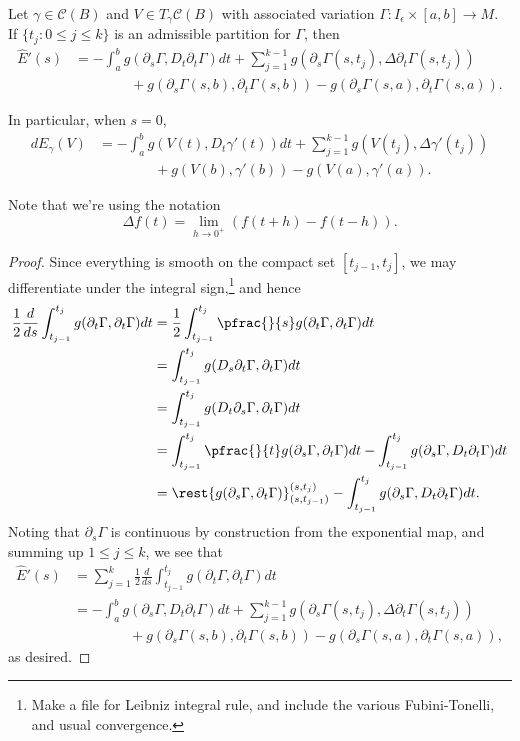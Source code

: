\begin{thm}\label{thm:firstVarEnergy}
    	Let $\gamma\in\mathcal{C}(B)$ and $V\in T_\gamma\mathcal{C}(B)$ with associated variation $\Gamma:I_\epsilon\times[a,b]\to M$.  If $\{t_j:0\leq j\leq k\}$ is an admissible partition for $\Gamma$, then
    	\begin{align*}
    		\hat{E}'(s)&=-\int_a^bg(\partial_s\Gamma,D_t\partial_t\Gamma)dt+\sum_{j=1}^{k-1}g(\partial_s\Gamma(s,t_j),\Delta\partial_t\Gamma(s,t_j))\\
    		&\qquad\qquad+g(\partial_s\Gamma(s,b),\partial_t\Gamma(s,b))-g(\partial_s\Gamma(s,a),\partial_t\Gamma(s,a)).
    	\end{align*}
    	
    	In particular, when $s=0$,
	\begin{align*}
		dE_\gamma(V)&=-\int_a^bg(V(t),D_t\gamma'(t))dt+\sum_{j=1}^{k-1}g(V(t_j),\Delta\gamma'(t_j))\\
		&\qquad\qquad +g(V(b),\gamma'(b))-g(V(a),\gamma'(a)).
	\end{align*}
\end{thm}

Note that we're using the notation
	$$\Delta f(t)=\lim_{h\to0^+}(f(t+h)-f(t-h)).$$

\begin{proof}
Since everything is smooth on the compact set $[t_{j-1},t_j]$, we may differentiate under the integral sign,\footnote{Make a file for Leibniz integral rule, and include the various Fubini-Tonelli, and usual convergence.} and hence
\begin{align*}
	\frac{1}{2}\frac{d}{ds}\int_{t_{j-1}}^{t_j}g(\partial_t\Gamma,\partial_t\Gamma)dt&=\frac{1}{2}\int_{t_{j-1}}^{t_j}\pfrac{}{s}g(\partial_t\Gamma,\partial_t\Gamma)dt\\
	&=\int_{t_{j-1}}^{t_j}g(D_s\partial_t\Gamma,\partial_t\Gamma)dt\\
	&=\int_{t_{j-1}}^{t_j}g(D_t\partial_s\Gamma,\partial_t\Gamma)dt\\
	&=\int_{t_{j-1}}^{t_j}\pfrac{}{t}g(\partial_s\Gamma,\partial_t\Gamma)dt-\int_{t_{j-1}}^{t_j}g(\partial_s\Gamma,D_t\partial_t\Gamma)dt\\
	&=\rest{g(\partial_s\Gamma,\partial_t\Gamma)}_{(s,t_{j-1})}^{(s,t_j)}-\int_{t_{j-1}}^{t_j}g(\partial_s\Gamma,D_t\partial_t\Gamma)dt.
\end{align*}
Noting that $\partial_s\Gamma$ is continuous by construction from the exponential map, and summing up $1\leq j\leq k$, we see that
\begin{align*}
	\hat{E}'(s)&=\sum_{j=1}^k\frac{1}{2}\frac{d}{ds}\int_{t_{j-1}}^{t_j}g(\partial_t\Gamma,\partial_t\Gamma)dt\\
	&=-\int_a^bg(\partial_s\Gamma,D_t\partial_t\Gamma)dt+\sum_{j=1}^{k-1}g(\partial_s\Gamma(s,t_j),\Delta\partial_t\Gamma(s,t_j))\\
	&\qquad\qquad+g(\partial_s\Gamma(s,b),\partial_t\Gamma(s,b))-g(\partial_s\Gamma(s,a),\partial_t\Gamma(s,a)),
\end{align*}
as desired.
\end{proof}

